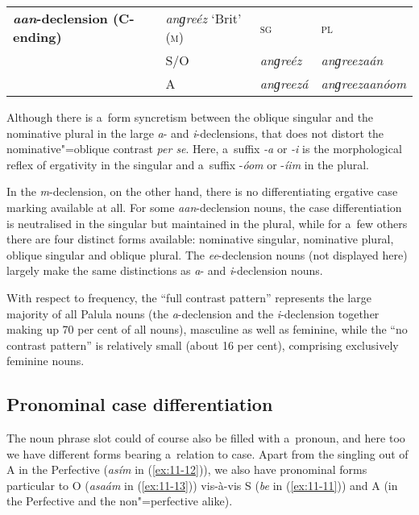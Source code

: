 \begin{table}[H]
\begin{tabularx}{\textwidth}{ | P{26mm} | P{32mm} | Q | Q |}
\hline
\textbf{\textit{aan}-declension (C-ending)} &
\textit{anɡreéz} `Brit' \textsc{(m)} &
\textsc{sg} &
\textsc{pl}\\
&
S/O &
\textit{anɡreéz} &
\textit{anɡreezaán} \\
&
A &
\textit{anɡreezá} &
\textit{anɡreezaanóom} \\\hline
\end{tabularx}
\end{table}


Although there is a~form syncretism between the oblique singular and the nominative plural in the large \textit{a}- and \textit{i}-declensions, that does not distort the nominative"=oblique contrast \textit{per se}. Here, a~suffix \textit{-a} or \textit{-i} is the morphological reflex of ergativity in the singular and a~suffix -\textit{óom} or -\textit{íim} in the plural. 


In the \textit{m}-declension, on the other hand, there is no differentiating ergative case marking available at all. For some \textit{aan}-declension nouns, the case differentiation is neutralised in the singular but maintained in the plural, while for a~few others there are four distinct forms available: nominative singular, nominative plural, oblique singular and oblique plural. The \textit{ee}-declension nouns (not displayed here) largely make the same distinctions as \textit{a}- and \textit{i}-declension nouns.


With respect to frequency, the ``full contrast pattern'' represents the large majority of all Palula nouns (the \textit{a}-declension and the \textit{i}-declension together making up 70 per cent of all nouns), masculine as well as feminine, while the ``no contrast pattern'' is relatively small (about 16 per cent), comprising exclusively feminine nouns.


\subsection{Pronominal case differentiation}
\label{subsec:11-2-2}


The noun phrase slot could of course also be filled with a~pronoun, and here too we have different forms bearing a~relation to case. Apart from the singling out of A in the Perfective (\textit{asím} in (\ref{ex:11-12})), we also have pronominal forms particular to O (\textit{asaám} in (\ref{ex:11-13})) vis-à-vis S (\textit{be} in (\ref{ex:11-11})) and A (in the Perfective and the non"=perfective alike).

